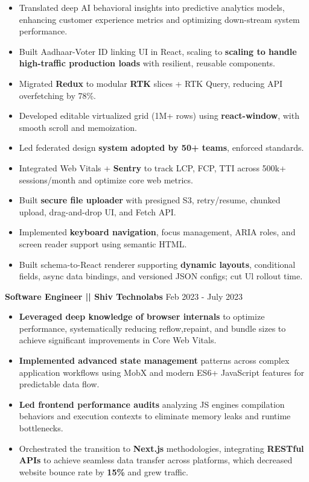 \documentclass[100pt,a4paper]{article}
\begin{document}
\begin{itemize}
\item {Translated deep AI behavioral insights into predictive analytics models, enhancing customer experience metrics and optimizing down-stream system performance.}
\item {Built Aadhaar-Voter ID linking UI in React, scaling to \textbf{scaling to handle high-traffic production loads} with resilient, reusable components.}
\item {Migrated \textbf{Redux} to modular \textbf{RTK} slices + RTK Query, reducing API overfetching by 78\%.}
\item {Developed editable virtualized grid (1M+ rows) using \textbf{react-window}, with smooth scroll and memoization.}
\item {Led federated design \textbf{system adopted by 50+ teams}, enforced standards.}
\item {Integrated Web Vitals + \textbf{Sentry} to track LCP, FCP, TTI across 500k+ sessions/month and optimize core web metrics.}
\item {Built \textbf{secure file uploader} with presigned S3, retry/resume, chunked upload, drag-and-drop UI, and Fetch API.}
\item {Implemented \textbf{keyboard navigation}, focus management, ARIA roles, and screen reader support using semantic HTML.}
\item {Built schema-to-React renderer supporting \textbf{dynamic layouts}, conditional fields, async data bindings, and versioned JSON configs; cut Ul rollout time.}
\end{itemize}




\vspace{5pt}
\textbf{Software Engineer || Shiv Technolabs}
\hfill Feb 2023 - July 2023
\begin{itemize}
\vspace{2pt}
\item {\textbf{Leveraged deep knowledge of browser internals} to optimize performance, systematically reducing reflow,repaint, and bundle sizes to achieve significant improvements in Core Web Vitals.}
\item {\textbf{Implemented advanced state management} patterns across complex application workflows using MobX and modern ES6+ JavaScript features for predictable data flow.}
\item {\textbf{Led frontend performance audits} analyzing JS engines compilation behaviors and execution contexts to eliminate memory leaks and runtime bottlenecks.}
\item {Orchestrated the transition to \textbf{Next.js} methodologies, integrating \textbf{RESTful APIs} to achieve seamless data transfer across platforms, which decreased website bounce rate by \textbf{15\%} and grew traffic.}
\end{itemize}
\end{document}
